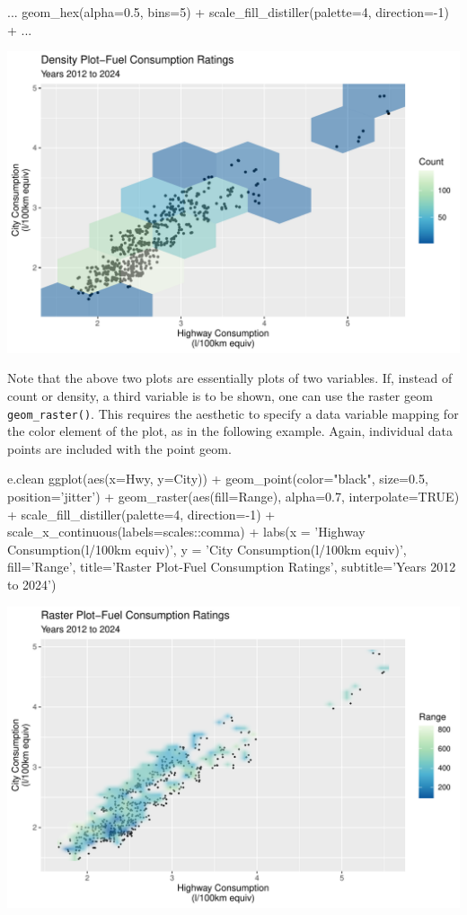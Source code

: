 \begin{samepage}
\begin{Rcode}
...
    geom_hex(alpha=0.5, bins=5) + 
    scale_fill_distiller(palette=4, direction=-1) +
...
\end{Rcode}
\end{samepage}

\begin{center}
  \includegraphics[width=.8\textwidth]{fuel.hex2d.pdf}
\end{center}

Note that the above two plots are essentially plots of two variables. If, instead of count or density, a third variable is to be shown, one can use the raster geom \texttt{geom\_raster()}. This requires the aesthetic to specify a data variable mapping for the color element of the plot, as in the following example. Again, individual data points are included with the point geom.

\begin{samepage}
\begin{Rcode}
e.clean %
  ggplot(aes(x=Hwy, y=City)) + 
    geom_point(color="black", size=0.5, 
               position='jitter') +
    geom_raster(aes(fill=Range), alpha=0.7, 
                interpolate=TRUE) + 
    scale_fill_distiller(palette=4, direction=-1) +
    scale_x_continuous(labels=scales::comma) +
    labs(x = 'Highway Consumption\n(l/100km equiv)', 
         y = 'City Consumption\n(l/100km equiv)', 
         fill='Range', 
         title='Raster Plot-Fuel Consumption Ratings', 
         subtitle='Years 2012 to 2024') 
\end{Rcode}
\end{samepage}

\begin{center}
  \includegraphics[width=.8\textwidth]{fuel.raster.pdf}
\end{center}


